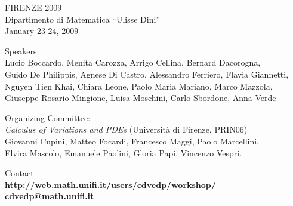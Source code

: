 \documentclass[a4paper]{article}
\newcommand{\buh}[1]{\textsf{#1}\\}
\newcommand{\buhh}[1]{\textsf{#1}\hspace{2.5cm}\mbox{}\\}
\begin{document}
\noindent
\begin{flushright}
\vspace{3.5cm}
\Huge
\buhh{FIRENZE 2009}

\vspace{3.5cm}
\Large
\buhh{Dipartimento di Matematica ``Ulisse Dini''}
\buhh{January 23-24, 2009}
\end{flushright}

\vspace{1.5cm}

\begin{center}
\Large
\buh{Speakers:}
\Large
Lucio Boccardo, %
Menita Carozza, %
Arrigo Cellina, %
Bernard Dacorogna, \\
Guido De Philippis, %
Agnese Di Castro, %
Alessandro Ferriero, %
Flavia Giannetti, \\%
Nguyen Tien Khai, %
Chiara Leone, 
Paolo Maria Mariano, %
Marco Mazzola, \\%
Giuseppe Rosario Mingione,
Luisa Moschini, %
Carlo Sbordone, %
Anna Verde

\vspace{2.5cm}
\buh{Organizing Committee:}
{\Large \emph{Calculus of Variations and PDEs} (Universit\`a di Firenze, PRIN06)}\\
\large
Giovanni Cupini,
Matteo Focardi,
Francesco Maggi,
Paolo Marcellini,\\
Elvira Mascolo,
Emanuele Paolini,
Gloria Papi,
Vincenzo Vespri.


\vspace{2.5cm}
\Large
\buh{Contact:}
\large
\bf\textsf{http://web.math.unifi.it/users/cdvedp/workshop/}
\hspace{1cm}
\bf\textsf{cdvedp@math.unifi.it}
\end{center}
\end{document}
